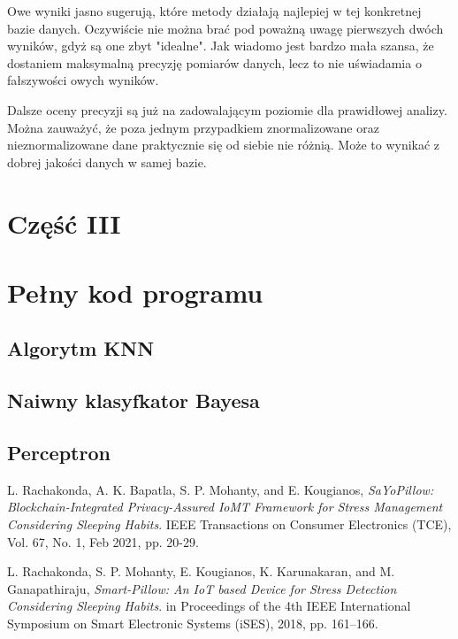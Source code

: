 \documentclass[12pt,a4paper]{article}
\begin{document}
        		Owe wyniki jasno sugerują, które metody działają najlepiej w tej konkretnej bazie danych. Oczywiście nie można brać pod poważną uwagę pierwszych dwóch wyników, gdyż są one zbyt "idealne". Jak wiadomo jest bardzo mała szansa, że dostaniem maksymalną precyzję pomiarów danych, lecz to nie uświadamia o fałszywości owych wyników.
        		
        		Dalsze oceny precyzji są już na zadowalającym poziomie dla prawidłowej analizy. Można zauważyć, że poza jednym przypadkiem znormalizowane oraz nieznormalizowane dane praktycznie się od siebie nie różnią. Może to wynikać z dobrej jakości danych w samej bazie.
        
	
	\newpage
    \section*{Część III}
    
    \section{Pełny kod programu}
        \subsection{Algorytm KNN}
            
        
        \subsection{Naiwny klasyfkator Bayesa}
            
        
        \subsection{Perceptron}
            
    
    
    \pagebreak
    
    \begin{thebibliography}{9}
            L. Rachakonda, A. K. Bapatla, S. P. Mohanty, and E. Kougianos,
            \emph{SaYoPillow: Blockchain-Integrated Privacy-Assured IoMT Framework for Stress Management Considering Sleeping Habits}.
            IEEE Transactions on Consumer Electronics (TCE), Vol. 67, No. 1, Feb 2021, pp. 20-29.
        
            L. Rachakonda, S. P. Mohanty, E. Kougianos, K. Karunakaran, and M. Ganapathiraju,
            \emph{Smart-Pillow: An IoT based Device for Stress Detection Considering Sleeping Habits}.
            in Proceedings of the 4th IEEE International Symposium on Smart Electronic Systems (iSES), 2018, pp. 161--166. 
    
    \end{thebibliography}
\end{document}
